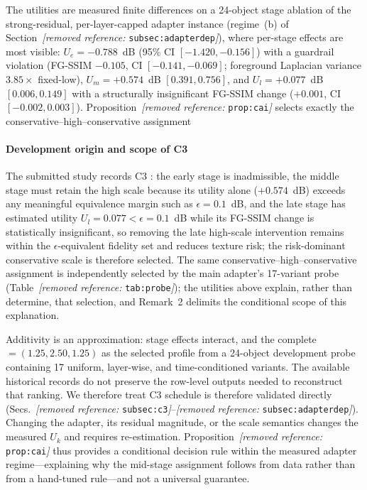 \documentclass[times,twocolumn,final]{elsarticle}
\providecommand{\DIFadd}[1]{{\protect\color{blue} \sf #1}} %
\providecommand{\DIFdel}[1]{{\protect\color{red} \scriptsize #1}} %
\providecommand{\DIFaddbegin}{} %
\providecommand{\DIFaddend}{} %
\providecommand{\DIFdelbegin}{} %
\providecommand{\DIFdelend}{} %
\begin{document}
\DIFdelbegin %
\DIFdel{The utilities are measured finite differences on a 24-object stage ablation of the strong-residual, per-layer-capped adapter instance (regime~(b) of Section~\textit{[removed reference: }\texttt{subsec:adapterdep}\textit{]}), where per-stage effects are most visible: $U_e=-0.788$~dB (95\% CI $[-1.420,-0.156]$) with a guardrail violation (FG-SSIM $-0.105$, CI $[-0.141,-0.069]$; foreground Laplacian variance $3.85\times$ fixed-low), $U_m=+0.574$~dB $[0.391,0.756]$, and $U_l=+0.077$~dB $[0.006,0.149]$ with a structurally insignificant FG-SSIM change ($+0.001$, CI $[-0.002,0.003]$). Proposition~\textit{[removed reference: }\texttt{prop:cai}\textit{]} selects exactly the conservative--high--conservative assignment }\DIFdelend \DIFaddbegin \paragraph{Development origin and scope of C3}
\DIFadd{The submitted study records }\DIFaddend C3 \DIFdelbegin \DIFdel{: the early stage is inadmissible, the middle stage must retain the high scale because its utility alone ($+0.574$~dB) exceeds any meaningful equivalence margin such as $\epsilon=0.1$~dB, and the late stage has estimated utility $U_l=0.077<\epsilon=0.1$~dB while its FG-SSIM change is statistically insignificant, so removing the late high-scale intervention remains within the $\epsilon$-equivalent fidelity set and reduces texture risk; the risk-dominant conservative scale is therefore selected. The same conservative--high--conservative assignment is independently selected by the main adapter's 17-variant probe (Table~\textit{[removed reference: }\texttt{tab:probe}\textit{]}); the utilities above explain, rather than determine, that selection, and Remark~2 delimits the conditional scope of this explanation.
}%

\DIFdel{Additivity is an approximation: stage effects interact, and the complete }\DIFdelend \DIFaddbegin \DIFadd{$=(1.25,2.50,1.25)$ as the selected profile from a 24-object development probe containing 17 uniform, layer-wise, and time-conditioned variants. The available historical records do not preserve the row-level outputs needed to reconstruct that ranking. We therefore treat }\DIFaddend C3 \DIFdelbegin \DIFdel{schedule is therefore validated directly (Secs.~\textit{[removed reference: }\texttt{subsec:c3}\textit{]}--\textit{[removed reference: }\texttt{subsec:adapterdep}\textit{]}). Changing the adapter, its residual magnitude, or the scale semantics changes the measured $U_k$ and requires re-estimation. Proposition~\textit{[removed reference: }\texttt{prop:cai}\textit{]} thus provides a conditional decision rule within the measured adapter regime---explaining why the mid-stage assignment follows from data rather than from a hand-tuned rule---and not a universal guarantee.
}%
\end{document}
